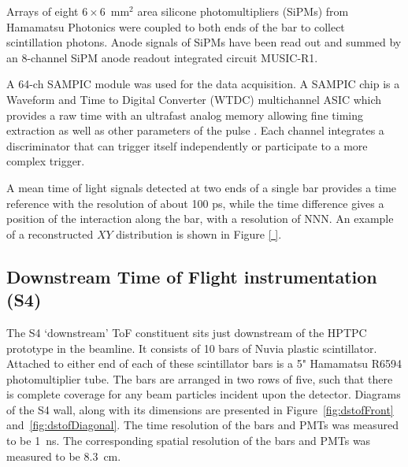 Arrays of eight $6 \times 6$~mm$^2$ area silicone photomultipliers (SiPMs) from Hamamatsu Photonics were coupled to both ends of the bar to collect scintillation photons. Anode signals of SiPMs have been read out and summed by an 8-channel SiPM anode readout integrated circuit MUSIC-R1. %

A 64-ch SAMPIC  module was used for the data acquisition. A SAMPIC chip is a Waveform and Time to Digital Converter (WTDC) multichannel ASIC which provides a raw time with an ultrafast analog memory allowing fine timing extraction as well as other parameters of the pulse \cite{SAMPIC}. Each channel integrates a discriminator that can trigger itself independently or participate to a more complex trigger. 

A mean time of light signals detected at two ends of a single bar provides a time reference with the resolution of about 100 ps, while the time difference gives a position of the interaction along the bar, with a resolution of NNN. An example of a reconstructed $XY$ distribution is shown in Figure \ref{ }.

    
    

    



\subsection{Downstream Time of Flight instrumentation (S4)}
	
The S4 `downstream' ToF constituent sits just downstream of the HPTPC prototype in the beamline. It consists of 10 bars of Nuvia plastic scintillator. Attached to either end of each of these scintillator bars is a 5" Hamamatsu R6594 photomultiplier tube. The bars are arranged in two rows of five, such that there is complete coverage for any beam particles incident upon the detector. Diagrams of the S4 wall, along with its dimensions are presented in Figure~\ref{fig:dstofFront} and~\ref{fig:dstofDiagonal}. The time resolution of the bars and PMTs was measured to be 1~ns. The corresponding spatial resolution of the bars and PMTs was measured to be 8.3~cm.
    
